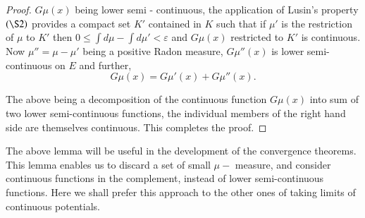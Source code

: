 \begin{proof}
  $G \mu (x)$ being lower semi - continuous, the application of
  Lusin's property $(\S 2)$ provides a compact set $K'$ contained in
  $K$ such that if $\mu'$ is the restriction of $\mu$ to $K'$ then $0
  \le \int d \mu -\int d \mu' < \varepsilon$ and $G \mu (x)$
  restricted to $K'$ is continuous. Now $\mu'' = \mu - \mu'$ being a
  positive Radon measure, $G \mu''(x)$ is lower semi-continuous on
  $E$ and further, 
  $$
  G \mu (x) = G \mu' (x) + G \mu'' (x).
  $$

  The above being a decomposition of the continuous function $G \mu (x)$
  into sum of two lower semi-continuous functions, the individual
  members of the right hand side are themselves continuous. This
  completes the proof. 
\end{proof}

The above lemma will be useful in the development of the convergence
theorems. This lemma enables us to discard a set of small $\mu-$\pageoriginale
measure, and consider continuous functions in the complement, instead
of lower semi-continuous functions. Here we shall prefer this approach
to the other ones of taking limits of continuous potentials. 
